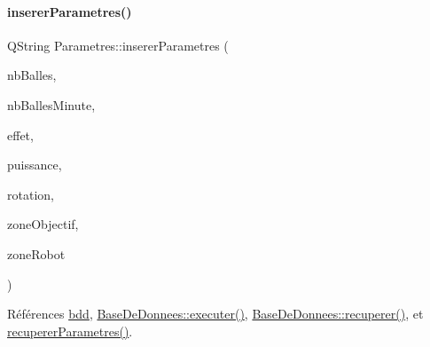 \paragraph{\texorpdfstring{inserer\+Parametres()}{insererParametres()}}
{\footnotesize\ttfamily Q\+String Parametres\+::inserer\+Parametres (\begin{DoxyParamCaption}\item[{Q\+String}]{nb\+Balles,  }\item[{Q\+String}]{nb\+Balles\+Minute,  }\item[{Q\+String}]{effet,  }\item[{Q\+String}]{puissance,  }\item[{Q\+String}]{rotation,  }\item[{Q\+String}]{zone\+Objectif,  }\item[{Q\+String}]{zone\+Robot }\end{DoxyParamCaption})}



Références \hyperlink{class_parametres_a1e21034f7e758d93974e0dc070d47dee}{bdd}, \hyperlink{class_base_de_donnees_aa8de5f8f8bb17edc43f5c0ee33712081}{Base\+De\+Donnees\+::executer()}, \hyperlink{class_base_de_donnees_a77539baad389f5acf754cd2cd452403e}{Base\+De\+Donnees\+::recuperer()}, et \hyperlink{class_parametres_a853872796d32655f3f1ffc090b6d076a}{recuperer\+Parametres()}.


